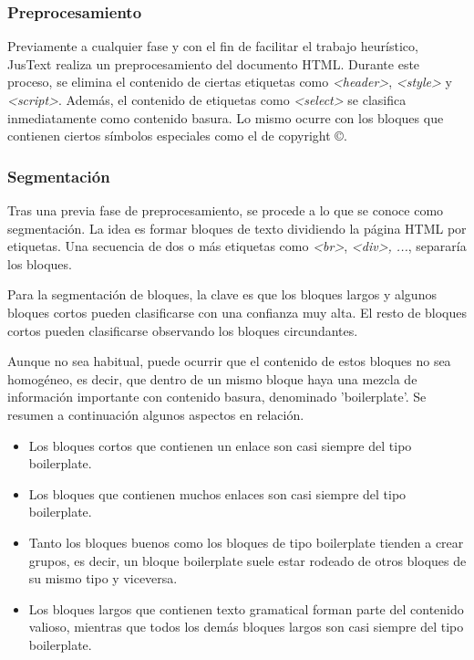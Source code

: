 \subsubsection{Preprocesamiento}
\label{subsubsec:preprocesamiento}

Previamente a cualquier fase y con el fin de facilitar el trabajo heurístico, JusText realiza un
preprocesamiento del documento HTML. Durante este proceso, se elimina el contenido de ciertas etiquetas como
\emph{<header>}, \emph{<style>} y \emph{<script>}. Además, el contenido de etiquetas como \emph{<select>}
se clasifica inmediatamente como contenido basura. Lo mismo ocurre con los bloques que contienen ciertos
símbolos especiales como el de copyright ©.

\subsubsection{Segmentación}
\label{subsubsec:segmentacion}

Tras una previa fase de preprocesamiento, se procede a lo que se conoce como segmentación. La idea es formar 
bloques de texto dividiendo la página HTML por etiquetas. Una secuencia de dos o más etiquetas como 
\emph{<br>}, \emph{<div>, ...}, separaría los bloques. 

Para la segmentación de bloques, la clave es que los bloques largos y algunos bloques cortos pueden
clasificarse con una confianza muy alta. El resto de bloques cortos pueden clasificarse observando los
bloques circundantes. 

Aunque no sea habitual, puede ocurrir que el contenido de estos bloques no sea homogéneo, es decir, que
dentro de un mismo bloque haya una mezcla de información importante con contenido basura, denominado
'boilerplate'. Se resumen a continuación algunos aspectos en relación.

\begin{itemize}
  \item Los bloques cortos que contienen un enlace son casi siempre del tipo boilerplate.
  \item Los bloques que contienen muchos enlaces son casi siempre del tipo boilerplate.
  \item Tanto los bloques buenos como los bloques de tipo boilerplate tienden a crear grupos, es decir,
  un bloque boilerplate suele estar rodeado de otros bloques de su mismo tipo y viceversa.
  \item Los bloques largos que contienen texto gramatical forman parte del contenido valioso, mientras que 
  todos los demás bloques largos son casi siempre del tipo boilerplate.
\end{itemize}

